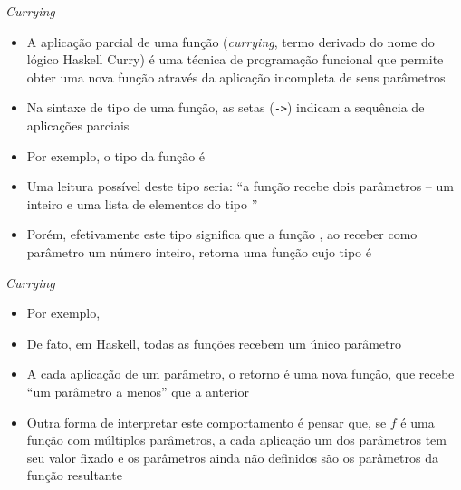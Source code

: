 \begin{frame}[fragile]{\it Currying}

    \begin{itemize}
        \item A aplicação parcial de uma função (\textit{currying}, termo derivado do nome
            do lógico Haskell Curry) é uma técnica de programação
            funcional que permite obter uma nova função através da aplicação incompleta de
            seus parâmetros

        \item Na sintaxe de tipo de uma função, as setas (\texttt{->}) indicam a sequência de
            aplicações parciais

        \item Por exemplo, o tipo da função  é


        \item Uma leitura possível deste tipo seria: ``a função  recebe dois
            parâmetros -- um inteiro e uma lista de elementos do tipo ''

        \item Porém, efetivamente este tipo significa que a função , ao receber
            como parâmetro um número inteiro, retorna uma função  cujo tipo
            é 

    \end{itemize}

\end{frame}

\begin{frame}[fragile]{\it Currying}

    \begin{itemize}
        \item Por exemplo, 


        \item De fato, em Haskell, todas as funções recebem um único parâmetro

        \item A cada aplicação de um parâmetro, o retorno é uma nova função, que recebe 
            ``um parâmetro a menos'' que a anterior

        \item Outra forma de interpretar este comportamento é pensar que, se $f$ é uma 
            função com múltiplos parâmetros, a cada aplicação um dos parâmetros tem seu
            valor fixado e os parâmetros ainda não definidos são os parâmetros da função
            resultante
    \end{itemize}

\end{frame}

